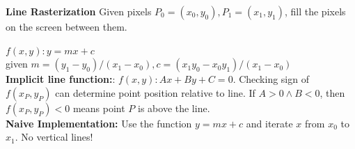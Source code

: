 \documentclass[letterpaper, 8pt]{extarticle}
\begin{document}
\begin{multicols*}{4}
    \textbf{Line Rasterization}
    Given pixels $P_0 = (x_0, y_0), P_1 = (x_1, y_1)$, fill the pixels on the screen between them.

    $f(x, y): y = mx + c$\\given $m=(y_1 - y_0)/(x_1 - x_0), c=(x_1y_0 - x_0y_1)/(x_1 - x_0)$\\
    \textbf{Implicit line function:}: $f(x,y): Ax + By + C = 0$. Checking sign of $f(x_P, y_P)$ can determine point position relative to line. If $A>0 \land B<0$, then $f(x_P, y_P) < 0$ means point $P$ is above the line.\\

    \textbf{Naive Implementation:} Use the function $y=mx+c$ and iterate $x$ from $x_0$ to $x_1$. No vertical lines!\\







\end{multicols*}
\end{document}
